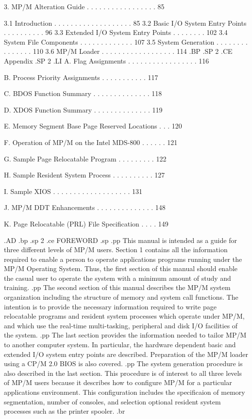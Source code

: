 3.   MP/M Alteration Guide  . . . . . . . . . . . . . . . . . 85

     3.1   Introduction . . . . . . . . . . . . . . . . . . . 85
     3.2   Basic I/O System Entry Points  . . . . . . . . . . 96
     3.3   Extended I/O System Entry Points . . . . . . . .  102
     3.4   System File Components . . . . . . . . . . . . .  107
     3.5   System Generation  . . . . . . . . . . . . . . .  110
     3.6   MP/M Loader  . . . . . . . . . . . . . . . . . .  114
.BP
.SP 2
.CE
Appendix
.SP 2
.LI
     A.  Flag Assignments . . . . . . . . . . . . . . . . .  116

     B.  Process Priority Assignments . . . . . . . . . . .  117

     C.  BDOS Function Summary  . . . . . . . . . . . . . .  118

     D.  XDOS Function Summary  . . . . . . . . . . . . . .  119

     E.  Memory Segment Base Page Reserved Locations  . . .  120

     F.  Operation of MP/M on the Intel MDS-800 . . . . . .  121

     G.  Sample Page Relocatable Program  . . . . . . . . .  122

     H.  Sample Resident System Process . . . . . . . . . .  127

     I.  Sample XIOS  . . . . . . . . . . . . . . . . . . .  131

     J.  MP/M DDT Enhancements  . . . . . . . . . . . . . .  148

     K.  Page Relocatable (PRL) File Specification  . . . .  149

.AD
.bp
.sp 2
.ce
FOREWORD
.sp
.pp
This manual is intended as a guide for three different levels of
MP/M users.  Section 1 contains all the information required to
enable a person to operate applications programs running under the
MP/M Operating System.  Thus, the first section of this manual
should enable the casual user to operate the system with a minimum
amount of study and training.
.pp
The second section of this manual describes the MP/M system
organization including the structure of memory and system call
functions.  The intention is to provide the
necessary information required to write page relocatable programs and
resident system processes which operate under MP/M, and which use
the real-time multi-tasking, peripheral and disk I/O facilities of
the system.
.pp
The last section provides the information needed to tailor MP/M
to another computer system.  In particular, the hardware dependent
basic and extended I/O system entry points are
described.
Preparation of the MP/M loader using a CP/M 2.0 BIOS is also
covered.
.pp
The system generation procedure is also described in the last
section.  This procedure is of interest to all three levels of
MP/M users because it describes how to configure MP/M for a particular
applications environment.  This configuration includes the specificaion
of memory segmentation, number of consoles, and selection optional
resident system processes such as the printer spooler.
.br
